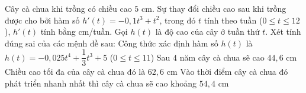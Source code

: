 \begin{ex}%
 Cây cà chua khi trồng có chiều cao $5$ cm. Sự thay đổi chiều cao sau khi trồng được cho bởi hàm số $h'(t)=-0,1t^3 + t^2$, trong đó $t$ tính theo tuần ($0 \le t \le 12$), $h'(t)$ tính bằng cm/tuần. Gọi $h(t)$ là độ cao của cây ở tuần thứ $t$. Xét tính đúng sai của các mệnh đề sau:
 \choiceTF
 {\True Công thức xác định hàm số $h(t)$ là $h(t)=-0,025t^4 + \dfrac{1}{3}t^3 + 5$ ($0 \le t \le 11$)}
 {Sau $4$ năm cây cà chua sẽ cao $44,6$ cm}
 {Chiều cao tối đa của cây cà chua đó là $62,6$ cm}
 {\True Vào thời điểm cây cà chua đó phát triển nhanh nhất thì cây cà chua sẽ cao khoảng $54,4$ cm}
\end{ex}
